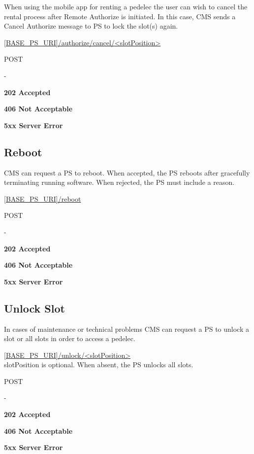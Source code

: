 When using the mobile app for renting a pedelec the user can wish to cancel the rental process after Remote Authorize is initiated. In this case, \acs{CMS} sends a Cancel Authorize message to \acs{PS} to lock the slot(s) again.

 \url{[BASE_PS_URI]/authorize/cancel/<slotPosition>}

 POST

 -

 \textbf{202 Accepted}

 \textbf{406 Not Acceptable}

\textbf{5xx Server Error}

\subsection{Reboot}

\acs{CMS} can request a \acs{PS} to reboot. When accepted, the \acs{PS} reboots after gracefully terminating running software. When rejected, the \acs{PS} must include a reason.

 \url{[BASE_PS_URI]/reboot}

 POST

 -

 \textbf{202 Accepted}

 \textbf{406 Not Acceptable}

\textbf{5xx Server Error}

\subsection{Unlock Slot}

In cases of maintenance or technical problems \acs{CMS} can request a \acs{PS} to unlock a slot or all slots in order to access a pedelec. 

 \url{[BASE_PS_URI]/unlock/<slotPosition>} \\
slotPosition is optional. When absent, the \acs{PS} unlocks all slots.

 POST

 -

 \textbf{202 Accepted}

 \textbf{406 Not Acceptable}

\textbf{5xx Server Error}